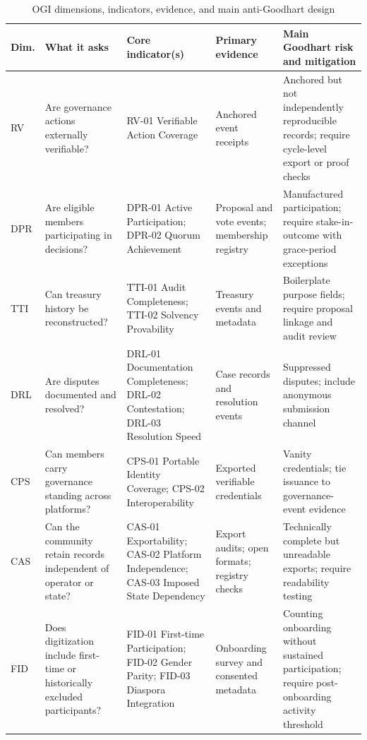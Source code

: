 \documentclass[sigconf,anonymous]{acmart}
\begin{document}
\begin{table}[t]
\caption{OGI dimensions, indicators, evidence, and main anti-Goodhart design}
\label{tab:ogi}
\small
\begin{tabularx}{\textwidth}{>{\raggedright\arraybackslash}p{0.7cm} >{\raggedright\arraybackslash}p{2.6cm} >{\raggedright\arraybackslash}p{3.2cm} >{\raggedright\arraybackslash}p{2.7cm} Y}
\toprule
Dim. & What it asks & Core indicator(s) & Primary evidence & Main Goodhart risk and mitigation \\
\midrule
RV  & Are governance actions externally verifiable?           & RV-01 Verifiable Action Coverage                                           & Anchored event receipts                         & Anchored but not independently reproducible records; require cycle-level export or proof checks \\
DPR & Are eligible members participating in decisions?         & DPR-01 Active Participation; DPR-02 Quorum Achievement                     & Proposal and vote events; membership registry   & Manufactured participation; require stake-in-outcome with grace-period exceptions \\
TTI & Can treasury history be reconstructed?                  & TTI-01 Audit Completeness; TTI-02 Solvency Provability                     & Treasury events and metadata                    & Boilerplate purpose fields; require proposal linkage and audit review \\
DRL & Are disputes documented and resolved?                   & DRL-01 Documentation Completeness; DRL-02 Contestation; DRL-03 Resolution Speed & Case records and resolution events          & Suppressed disputes; include anonymous submission channel \\
CPS & Can members carry governance standing across platforms?  & CPS-01 Portable Identity Coverage; CPS-02 Interoperability                 & Exported verifiable credentials                 & Vanity credentials; tie issuance to governance-event evidence \\
CAS & Can the community retain records independent of operator or state? & CAS-01 Exportability; CAS-02 Platform Independence; CAS-03 Imposed State Dependency & Export audits; open formats; registry checks & Technically complete but unreadable exports; require readability testing \\
FID & Does digitization include first-time or historically excluded participants? & FID-01 First-time Participation; FID-02 Gender Parity; FID-03 Diaspora Integration & Onboarding survey and consented metadata & Counting onboarding without sustained participation; require post-onboarding activity threshold \\
\bottomrule
\end{tabularx}
\end{table}
\end{document}
